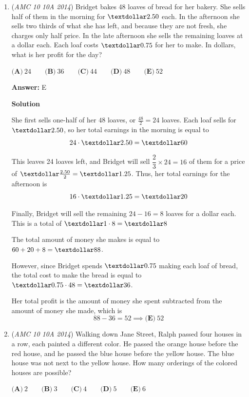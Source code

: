 \begin{enumerate}
	\item (\textit{AMC 10 10A 2014}) Bridget bakes 48 loaves of bread for her bakery. She sells half of them in the morning for $\textdollar 2.50$ each. In the afternoon she sells two thirds of what she has left, and because they are not fresh, she charges only half price. In the late afternoon she sells the remaining loaves at a dollar each. Each loaf costs $\textdollar 0.75$ for her to make. In dollars, what is her profit for the day?


 $\textbf{(A)}\ 24\qquad\textbf{(B)}\ 36\qquad\textbf{(C)}\ 44\qquad\textbf{(D)}\ 48\qquad\textbf{(E)}\ 52$

 \textbf{Answer: }E



\textbf{Solution}

She first sells one-half of her $48$ loaves, or $\frac{48}{2}=24$ loaves. Each loaf sells for $\textdollar 2.50$, so her total earnings in the morning is equal to 
 \[24\cdot \textdollar 2.50 = \textdollar 60\]

 This leaves 24 loaves left, and Bridget will sell $\dfrac{2}{3}\times 24=16$ of them for a price of $\textdollar\frac{2.50}{2}=\textdollar 1.25$. Thus, her total earnings for the afternoon is 
 \[16\cdot \textdollar 1.25  = \textdollar 20\]

 Finally, Bridget will sell the remaining $24-16=8$ loaves for a dollar each. This is a total of $\textdollar 1\cdot 8 = \textdollar 8$

 The total amount of money she makes is equal to $60+20+8=\textdollar 88$.

 However, since Bridget spends $\textdollar 0.75$ making each loaf of bread, the total cost to make the bread is equal to  $\textdollar 0.75\cdot48=\textdollar 36$.

 Her total profit is the amount of money she spent subtracted from the amount of money she made, which is 
 \[88-36=52\implies\boxed{\textbf{(E)} \ 52}\]



	\item (\textit{AMC 10 10A 2014}) Walking down Jane Street, Ralph passed four houses in a row, each painted a different color. He passed the orange house before the red house, and he passed the blue house before the yellow house. The blue house was not next to the yellow house. How many orderings of the colored houses are possible?


 $\textbf{(A)}\ 2\qquad\textbf{(B)}\ 3\qquad\textbf{(C)}\ 4\qquad\textbf{(D)}\ 5\qquad\textbf{(E)}\ 6$


\end{enumerate}

